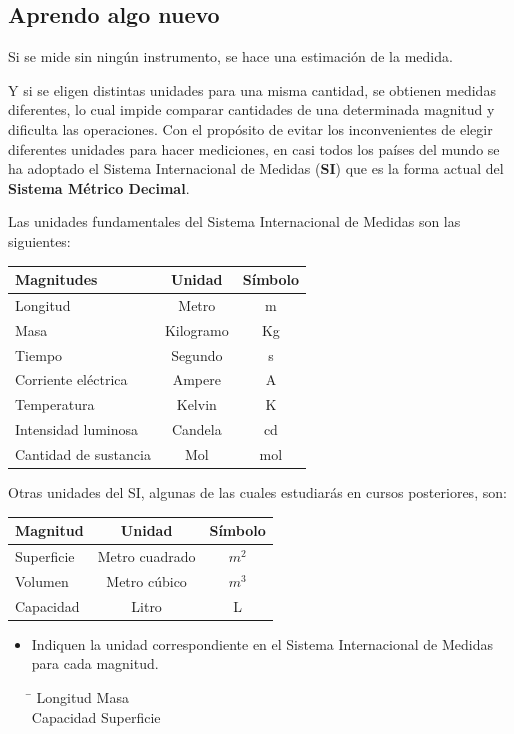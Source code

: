 \documentclass[letterpaper,11pt,twoside]{article}
\begin{document}
\begin{multicols}{2}
\section*{Aprendo algo nuevo}
Si se mide sin ningún instrumento, se hace una estimación
de la medida.

Y si se eligen distintas unidades para una misma cantidad, se
obtienen medidas diferentes, lo cual impide comparar cantidades de una determinada magnitud y dificulta las operaciones.
Con el propósito de evitar los inconvenientes de elegir diferentes unidades para hacer mediciones, en casi todos los
países del mundo se ha adoptado el Sistema Internacional de Medidas (\textbf{SI}) que es la forma actual del \textbf{Sistema Métrico Decimal}.

Las unidades fundamentales del Sistema Internacional de Medidas son las siguientes:
\begin{center}
\begin{tabular}{|l|c|c|}
\hline 
\qquad \textbf{Magnitudes} & \textbf{Unidad} & \textbf{Símbolo} \\ 
\hline 
Longitud & Metro & m \\ 
\hline 
Masa & Kilogramo & Kg \\ 
\hline 
Tiempo & Segundo & s \\ 
\hline 
Corriente eléctrica & Ampere & A \\ 
\hline 
Temperatura & Kelvin & K \\ 
\hline 
Intensidad luminosa & Candela & cd \\ 
\hline 
Cantidad de sustancia & Mol & mol \\ 
\hline 
\end{tabular} 
\end{center}
Otras unidades del SI, algunas de las cuales estudiarás en
cursos posteriores, son:
\begin{center}
\begin{tabular}{|l|c|c|}
\hline 
\qquad \textbf{Magnitud} & \textbf{Unidad} & \textbf{Símbolo} \\ 
\hline 
Superficie & Metro cuadrado & $m^{2}$ \\ 
\hline 
Volumen & Metro cúbico & $m^{3}$ \\ 
\hline 
Capacidad & Litro & L \\ 
\hline 
\end{tabular} 
\end{center}
\begin{itemize}
\item Indiquen la unidad correspondiente en el Sistema Internacional de Medidas para cada magnitud.
\begin{tabbing}
\hspace{2cm}\=\kill
Longitud \> Masa \\ 
Capacidad \> Superficie 
\end{tabbing} 
\end{itemize}
\end{multicols}
\end{document}
